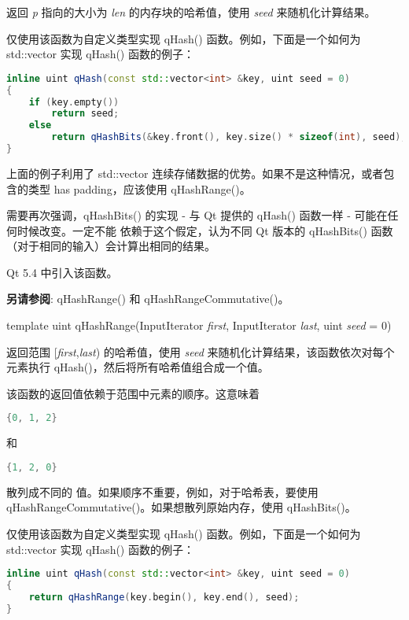 返回 \emph{p} 指向的大小为 \emph{len} 的内存块的哈希值，使用 \emph{seed} 来随机化计算结果。

仅使用该函数为自定义类型实现 qHash() 函数。例如，下面是一个如何为 std::vector 实现 qHash() 函数的例子：


\begin{lstlisting}[language=C++]
inline uint qHash(const std::vector<int> &key, uint seed = 0)
{
    if (key.empty())
        return seed;
    else
        return qHashBits(&key.front(), key.size() * sizeof(int), seed);
}
\end{lstlisting}

上面的例子利用了 std::vector 连续存储数据的优势。如果不是这种情况，或者包含的类型 has padding，应该使用 qHashRange()。

需要再次强调，qHashBits() 的实现 - 与 Qt 提供的 qHash() 函数一样 - 可能在任何时候改变。一定不能 依赖于这个假定，认为不同 Qt 版本的 qHashBits() 函数（对于相同的输入）会计算出相同的结果。

Qt 5.4 中引入该函数。

\textbf{另请参阅}: qHashRange() 和 qHashRangeCommutative()。

template uint qHashRange(InputIterator \emph{first}, InputIterator \emph{last}, uint \emph{seed} = 0)

返回范围 [\emph{first},\emph{last}) 的哈希值，使用 \emph{seed} 来随机化计算结果，该函数依次对每个元素执行 qHash()，然后将所有哈希值组合成一个值。

该函数的返回值依赖于范围中元素的顺序。这意味着

\begin{lstlisting}[language=C++]
{0, 1, 2}
\end{lstlisting}

和

\begin{lstlisting}[language=C++]
{1, 2, 0}
\end{lstlisting}

散列成不同的 值。如果顺序不重要，例如，对于哈希表，要使用 qHashRangeCommutative()。如果想散列原始内存，使用 qHashBits()。

仅使用该函数为自定义类型实现 qHash() 函数。例如，下面是一个如何为
std::vector 实现 qHash() 函数的例子：

\begin{lstlisting}[language=C++]
inline uint qHash(const std::vector<int> &key, uint seed = 0)
{
    return qHashRange(key.begin(), key.end(), seed);
}
\end{lstlisting}

